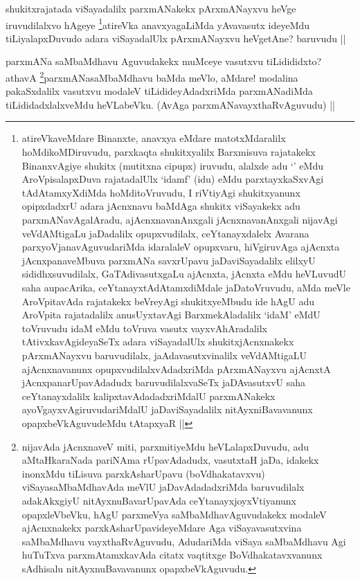 \begin{artha}
shukitxrajatada viSayadalilx parxmANakekx pArxmANayxvu heVge iruvudilalxvo hAgeye \footnote[1]{atireVkaveMdare Binanxte, anavxya eMdare matotxMdaralilx hoMdikoMDiruvudu, parxkaqta shukitxyalilx Barxmisuva rajatakekx BinanxvAgiye shukitx (mutitxna cipupx) iruvudu, alalxde adu `\stext' eMdu AroVpisalapxDuva rajatadalUlx `idamf' (idu) eMdu parxtayxkaSxvAgi tAdAtamxyXdiMda hoMditoVruvudu, I riVtiyAgi shukitxyanunx opipxdadxrU adara jAcnxnavu baMdAga shukitx viSayakekx adu parxmANavAgalAradu, ajAcnxnavanAnxgali jAcnxnavanAnxgali nijavAgi veVdAMtigaLu jaDadalilx opupxvudilalx, ceYtanayxdalelx Avarana parxyoVjanavAguvudariMda idaralaleV opupxvaru, hiVgiruvAga ajAcnxta jAcnxpanaveMbuva parxmANa savxrUpavu jaDaviSayadalilx elilxyU sididhxsuvudilalx, GaTAdivasutxgaLu ajAcnxta, jAcnxta eMdu heVLuvudU saha aupacArika, ceYtanayxtAdAtamxdiMdale jaDatoVruvudu, aMda meVle AroVpitavAda rajatakekx beVreyAgi shukitxyeMbudu ide hAgU adu AroVpita rajatadalilx anusUyxtavAgi BarxmekAladalilx `idaM' eMdU toVruvudu idaM eMdu toVruva vasutx vayxvAhAradalilx tAtivxkavAgideyaSeTx adara viSayadalUlx shukitxjAcnxnakekx pArxmANayxvu baruvudilalx, jaAdavasutxvinalilx veVdAMtigaLU ajAcnxnavanunx opupxvudilalxvAdadxriMda pArxmANayxvu ajAcnxtA jAcnxpanarUpavAdadudx baruvudilalxvaSeTx jaDAvasutxvU saha ceYtanayxdalilx kalipxtavAdadadxriMdalU parxmANakekx ayoVgayxvAgiruvudariMdalU jaDaviSayadalilx nitAyxniBavavanunx opapxbeVkAguvudeMdu tAtapxyaR ||}atireVka anavxyagaLiMda yAvavasutx ideyeMdu tiLiyalapxDuvudo adara viSayadalUlx pArxmANayxvu heVgetAne? baruvudu ||
\end{artha}

\begin{artha}
parxmANa saMbaMdhavu Aguvudakekx muMceye vasutxvu tiLidididxto? athavA \footnote[1]{nijavAda jAcnxnaveV miti, parxmitiyeMdu heVLalapxDuvudu, adu aMtaHkaraNada pariNAma rUpavAdadudx, vasutxtaH jaDa, idakekx inonxMdu tiLisuva parxkAsharUpavu (boVdhakatavxvu) viSayasaMbaMdhavAda meVlU jaDavAdadadxriMda baruvudilalx adakAkxgiyU nitAyxnuBavarUpavAda ceYtanayxjoyxVtiyanunx opapxleVbeVku, hAgU parxmeVya saMbaMdhavAguvudakekx modaleV ajAcnxnakekx parxkAsharUpavideyeMdare Aga viSayavasutxvina saMbaMdhavu vayxthaRvAguvudu, AdudariMda viSaya saMbaMdhavu Agi huTuTxva parxmAtamxkavAda citatx vaqtitxge BoVdhakatavxvanunx sAdhisalu nitAyxnuBavavanunx opapxbeVkAguvudu.}parxmANasaMbaMdhavu baMda meVlo, aMdare! modalina pakaSxdalilx vasutxvu modaleV tiLidideyAdadxriMda parxmANadiMda tiLididadxlalxveMdu heVLabeVku. (AvAga parxmANavayxthaRvAguvudu) ||
\end{artha}

